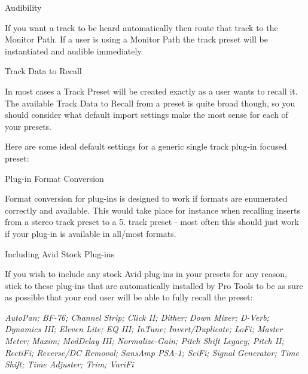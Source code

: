  
\begin{DoxyItemize}
\item Audibility


\begin{DoxyItemize}
\item If you want a track to be heard automatically then route that track to the Monitor Path. If a user is using a Monitor Path the track preset will be instantiated and audible immediately.  
\end{DoxyItemize}
\item Track Data to Recall


\begin{DoxyItemize}
\item In most cases a Track Preset will be created exactly as a user wants to recall it. The available Track Data to Recall from a preset is quite broad though, so you should consider what default import settings make the most sense for each of your presets.

Here are some ideal default settings for a generic single track plug-\/in focused preset\+:

   
\end{DoxyItemize}
\item Plug-\/in Format Conversion


\begin{DoxyItemize}
\item Format conversion for plug-\/ins is designed to work if formats are enumerated correctly and available. This would take place for instance when recalling inserts from a stereo track preset to a 5. track preset -\/ most often this should just work if your plug-\/in is available in all/most formats.  
\end{DoxyItemize}
\item Including Avid Stock Plug-\/ins


\begin{DoxyItemize}
\item If you wish to include any stock Avid plug-\/ins in your presets for any reason, stick to these plug-\/ins that are automatically installed by Pro Tools to be as sure as possible that your end user will be able to fully recall the preset\+:


\begin{DoxyItemize}
\item {\itshape Auto\+Pan; B\+F-\/76; Channel Strip; Click I\+I; Dither; Down Mixer; D-\/\+Verb; Dynamics I\+I\+I; Eleven Lite; E\+Q I\+I\+I; In\+Tune; Invert/\+Duplicate; Lo\+Fi; Master Meter; Maxim; Mod\+Delay I\+I\+I; Normalize-\/\+Gain; Pitch Shift Legacy; Pitch I\+I; Recti\+Fi; Reverse/\+D\+C Removal; Sans\+Amp P\+S\+A-\/1; Sci\+Fi; Signal Generator; Time Shift; Time Adjuster; Trim; Vari\+Fi}  
\end{DoxyItemize}


\end{DoxyItemize}
\end{DoxyItemize}
